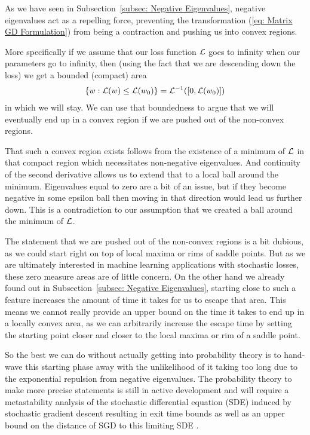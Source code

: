 As we have seen in Subsection~\ref{subsec: Negative Eigenvalues}, negative
eigenvalues act as a repelling force, preventing the transformation (\ref{eq:
Matrix GD Formulation}) from being a contraction and pushing us into convex
regions.

More specifically if we assume that our loss function \(\mathcal{L}\) goes to infinity when
our parameters go to infinity, then (using the fact that we are descending down
the loss) we get a bounded (compact) area 
%
\begin{align*}
	\{w : \mathcal{L}(w) \le \mathcal{L}(w_0)\} = \mathcal{L}^{-1}([0, \mathcal{L}(w_0)])
\end{align*}
%
in which we will stay. We can use that boundedness to argue that we will
eventually end up in a convex region if we are pushed out of the non-convex
regions.

That such a convex region exists follows from the existence of a minimum of
\(\mathcal{L}\) in that compact region which necessitates non-negative
eigenvalues. And continuity of the second derivative allows us to extend that to 
a local ball around the minimum. Eigenvalues equal to zero
are a bit of an issue, but if they become negative in some epsilon ball
then moving in that direction would lead us further down. This is a contradiction
to our assumption that we created a ball around the minimum of \(\mathcal{L}\).

The statement that we are pushed out of the non-convex regions is a bit
dubious, as we could start right on top of local maxima or rims of saddle points.
But as we are ultimately interested in machine learning applications with
stochastic losses, these zero measure areas are of little concern. On the other
hand we already found out in Subsection~\ref{subsec: Negative Eigenvalues},
starting close to such a feature
increases the amount of time it takes for us to escape that area. This means
we cannot really provide an upper bound on the time it takes to end up in
a locally convex area, as we can arbitrarily increase the escape time by
setting the starting point closer and closer to the local maxima or rim of a
saddle point.

So the best we can do without actually getting into probability theory is to
hand-wave this starting phase away with the unlikelihood of it taking too long
due to the exponential repulsion from negative eigenvalues. The probability
theory to make more precise statements is still in active development and will
require a metastability analysis of the stochastic differential equation (SDE)
induced by stochastic gradient descent
\parencite[e.g.][]{bovierMetastabilityPotentialTheoreticApproach2015,nguyenFirstExitTime2019}
resulting in exit time bounds as well as an upper bound on the distance of SGD
to this limiting SDE
\parencite[e.g.][]{liStochasticModifiedEquations2017,ankirchnerApproximatingStochasticGradient2021}.

